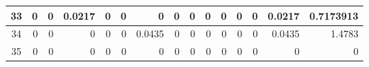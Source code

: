 \begin{table}[hb!]
\begin{adjustbox}{width = \textwidth, center}
\begin{tabular}{|c|r|r|r|r|r|r|r|r|r|r|r|r|r|r|}
        \rowcolor[HTML]{FFFFFF} 
        \cellcolor[HTML]{CFE2F3}33                                  & 0                                              & 0                                              & \cellcolor[HTML]{C7E9D8}0.0217                 & 0                                              & 0                                              & 0                                              & 0                                              & 0                                               & 0                                               & 0                                               & 0                                               & 0                                               & \cellcolor[HTML]{D9D2E9}0.0217                                                  & \cellcolor[HTML]{D9D2E9}0.7173913                                                     \\ \hline
        \rowcolor[HTML]{FFFFFF} 
        \cellcolor[HTML]{CFE2F3}34                                  & 0                                              & 0                                              & 0                                              & 0                                              & 0                                              & \cellcolor[HTML]{8FD2B1}0.0435                 & 0                                              & 0                                               & 0                                               & 0                                               & 0                                               & 0                                               & \cellcolor[HTML]{D9D2E9}0.0435                                                  & \cellcolor[HTML]{D9D2E9}1.4783                                                        \\ \hline
        \rowcolor[HTML]{FFFFFF} 
        \cellcolor[HTML]{CFE2F3}35                                  & 0                                              & 0                                              & 0                                              & 0                                              & 0                                              & 0                                              & 0                                              & 0                                               & 0                                               & 0                                               & 0                                               & 0                                               & \cellcolor[HTML]{D9D2E9}0                                                       & \cellcolor[HTML]{D9D2E9}0                                                             \\ \hline

\end{tabular}
\end{adjustbox}
\end{table}
